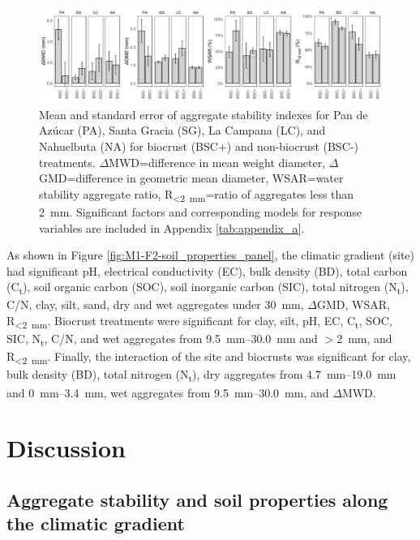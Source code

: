 \begin{figure}[H]
	\centering
	\includegraphics[width=1\textwidth]{img/M1-Figure_5.png}
	\caption{Mean and standard error of aggregate stability indexes for Pan de Azúcar (PA), Santa Gracia (SG), La Campana (LC),
    and Nahuelbuta (NA) for biocrust (BSC+) and non-biocrust (BSC-) treatments. $\Delta$MWD=difference in mean weight diameter,
    $\Delta$GMD=difference in geometric mean diameter, WSAR=water stability aggregate ratio, R\textsubscript{<\SI{2}{\milli\meter}}=ratio of aggregates less than \SI{2}{\milli\meter}. Significant factors and corresponding models for response variables are included in Appendix \ref{tab:appendix_a}.}
	\label{fig:M1-F5}
\end{figure}

As shown in Figure \ref{fig:M1-F2-soil_properties_panel}, the climatic gradient (site) had significant pH, electrical conductivity (EC), bulk density (BD), total carbon (C\textsubscript{t}), soil organic carbon (SOC), soil inorganic carbon (SIC), total nitrogen (N\textsubscript{t}), C/N, clay, silt, sand, dry and wet aggregates under \SI{30}{\milli\meter}, $\Delta$GMD, WSAR, R\textsubscript{<\SI{2}{\milli\meter}}. Biocrust treatments were significant for clay, silt, pH, EC, C\textsubscript{t}, SOC, SIC, N\textsubscript{t}, C/N, and wet aggregates from \SIrange{9.5}{30.0}{\milli\meter} and $>$\SI{2}{\milli\meter}, and R\textsubscript{<\SI{2}{\milli\meter}}. Finally, the interaction of the site and biocrusts was significant for clay, bulk density (BD), total nitrogen (N\textsubscript{t}), dry aggregates from \SIrange{4.7}{19.0}{\milli\meter} and \SIrange{0}{3.4}{\milli\meter}, wet aggregates from \SIrange{9.5}{30.0}{\milli\meter}, and $\Delta$MWD.

\section{Discussion}

\subsection{Aggregate stability and soil properties along the climatic gradient}

